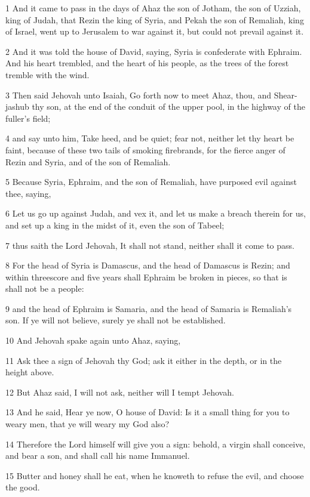 \par 1 And it came to pass in the days of Ahaz the son of Jotham, the son of Uzziah, king of Judah, that Rezin the king of Syria, and Pekah the son of Remaliah, king of Israel, went up to Jerusalem to war against it, but could not prevail against it.
\par 2 And it was told the house of David, saying, Syria is confederate with Ephraim. And his heart trembled, and the heart of his people, as the trees of the forest tremble with the wind.
\par 3 Then said Jehovah unto Isaiah, Go forth now to meet Ahaz, thou, and Shear-jashub thy son, at the end of the conduit of the upper pool, in the highway of the fuller's field;
\par 4 and say unto him, Take heed, and be quiet; fear not, neither let thy heart be faint, because of these two tails of smoking firebrands, for the fierce anger of Rezin and Syria, and of the son of Remaliah.
\par 5 Because Syria, Ephraim, and the son of Remaliah, have purposed evil against thee, saying,
\par 6 Let us go up against Judah, and vex it, and let us make a breach therein for us, and set up a king in the midst of it, even the son of Tabeel;
\par 7 thus saith the Lord Jehovah, It shall not stand, neither shall it come to pass.
\par 8 For the head of Syria is Damascus, and the head of Damascus is Rezin; and within threescore and five years shall Ephraim be broken in pieces, so that is shall not be a people:
\par 9 and the head of Ephraim is Samaria, and the head of Samaria is Remaliah's son. If ye will not believe, surely ye shall not be established.
\par 10 And Jehovah spake again unto Ahaz, saying,
\par 11 Ask thee a sign of Jehovah thy God; ask it either in the depth, or in the height above.
\par 12 But Ahaz said, I will not ask, neither will I tempt Jehovah.
\par 13 And he said, Hear ye now, O house of David: Is it a small thing for you to weary men, that ye will weary my God also?
\par 14 Therefore the Lord himself will give you a sign: behold, a virgin shall conceive, and bear a son, and shall call his name Immanuel.
\par 15 Butter and honey shall he eat, when he knoweth to refuse the evil, and choose the good.
